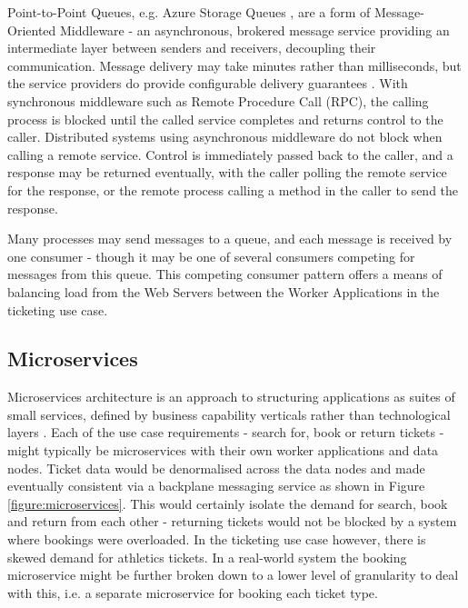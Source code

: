 Point-to-Point Queues, e.g. Azure Storage Queues \cite{RN1072}, are a form of Message-Oriented Middleware - an asynchronous, brokered message service providing an intermediate layer between senders and receivers, decoupling their communication.  Message delivery may take minutes rather than milliseconds, but the service providers do provide configurable delivery guarantees \cite{RN65}.  With synchronous middleware such as Remote Procedure Call (RPC), the calling process is blocked until the called service completes and returns control to the caller.  Distributed systems using asynchronous middleware do not block when calling a remote service.  Control is immediately passed back to the caller, and a response may be returned eventually, with the caller polling the remote service for the response, or the remote process calling a method in the caller to send the response.

Many processes may send messages to a queue, and each message is received by one consumer - though it may be one of several consumers competing for messages from this queue.  This competing consumer pattern offers a means of balancing load from the Web Servers between the Worker Applications in the ticketing use case.

%
%
\FloatBarrier
\subsection{Microservices}\label{sec:microservices}

Microservices architecture is an approach to structuring applications as suites of small services, defined by business capability verticals rather than technological layers \cite{RN1069} \cite{RN1070}.  Each of the use case requirements - search for, book or return tickets - might typically be microservices with their own worker applications and data nodes.  Ticket data would be denormalised across the data nodes and made eventually consistent via a backplane messaging service \cite{RN1071} as shown in Figure \ref{figure:microservices}.  This would certainly isolate the demand for search, book and return from each other - returning tickets would not be blocked by a system where bookings were overloaded.  In the ticketing use case however, there is skewed demand for athletics tickets.  In a real-world system the booking microservice might be further broken down to a lower level of granularity to deal with this, i.e. a separate microservice for booking each ticket type.

